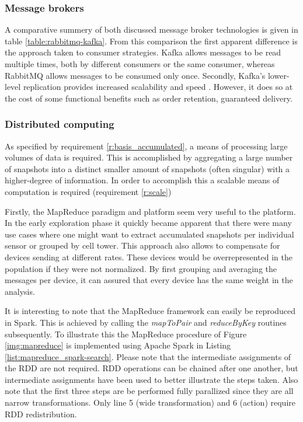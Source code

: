 \subsubsection*{Message brokers}

A comparative summery of both discussed message broker technologies is given in table \ref{table:rabbitmq-kafka}. From this comparison the first apparent difference is the approach taken to consumer strategies. Kafka allows messages to be read multiple times, both by different consumers or the same consumer, whereas RabbitMQ allows messages to be consumed only once. Secondly, Kafka's lower-level replication provides increased scalability and speed \cite{kafka_vs_rabbitmq}. However, it does so at the cost of some functional benefits such as order retention, guaranteed delivery.

\subsubsection{Distributed computing}
As specified by requirement \ref{r:basis_accumulated}, a means of processing large volumes of data is required. This is accomplished by aggregating a large number of snapshots into a distinct smaller amount of snapshots (often singular) with a higher-degree of information. In order to accomplish this a scalable means of computation is required (requirement \ref{r:scale})

Firstly, the MapReduce paradigm and platform seem very useful to the platform. In the early exploration phase it quickly became apparent that there were many use cases where one might want to extract accumulated snapshots per individual sensor or grouped by cell tower. This approach also allows to compensate for devices sending at different rates. These devices would be overrepresented in the population if they were not normalized. By first grouping and averaging the messages per device, it can assured that every device has the same weight in the analysis.




It is interesting to note that the MapReduce framework can easily be reproduced in Spark. This is achieved by calling the \emph{mapToPair} and \emph{reduceByKey} routines subsequently. To illustrate this the MapReduce procedure of Figure \ref{img:mapreduce} is implemented using Apache Spark in Listing \ref{list:mapreduce_spark-search}. Please note that the intermediate assignments of the RDD are not required. RDD operations can be chained after one another, but intermediate assignments have been used to better illustrate the steps taken. Also note that the first three steps are be performed fully parallized since they are all narrow transformations. Only line 5 (wide transformation) and 6 (action) require RDD redistribution.


